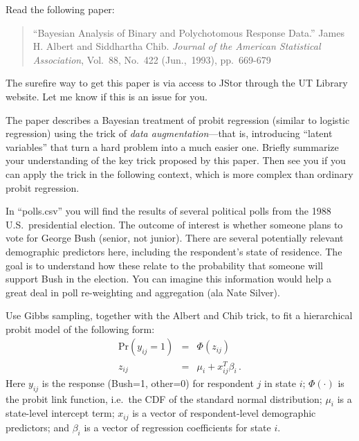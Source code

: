 \documentclass{article}
\begin{document}
Read the following paper:
\begin{quotation}
``Bayesian Analysis of Binary and Polychotomous Response Data.''  James H. Albert and Siddhartha Chib.  \textit{Journal of the American Statistical Association}, Vol.~88, No.~422 (Jun.,~1993), pp.~669-679
\end{quotation}
The surefire way to get this paper is via access to JStor through the UT Library website.  Let me know if this is an issue for you.

The paper describes a Bayesian treatment of probit regression (similar to logistic regression) using the trick of \textit{data augmentation}---that is, introducing ``latent variables'' that turn a hard problem into a much easier one.  Briefly summarize your understanding of the key trick proposed by this paper.  Then see you if you can apply the trick in the following context, which is more complex than ordinary probit regression.

In ``polls.csv'' you will find the results of several political polls from the 1988 U.S.~presidential election.  The outcome of interest is whether someone plans to vote for George Bush (senior, not junior).  There are several potentially relevant demographic predictors here, including the respondent's state of residence.  The goal is to understand how these relate to the probability that someone will support Bush in the election.  You can imagine this information would help a great deal in poll re-weighting and aggregation (ala Nate Silver).

Use Gibbs sampling, together with the Albert and Chib trick, to fit a hierarchical probit model of the following form:
\begin{eqnarray*}
\mbox{Pr}(y_{ij} = 1) &=& \Phi(z_{ij})  \\
z_{ij} &=& \mu_i + x_{ij}^T \beta_i \, .
\end{eqnarray*}
Here $y_{ij}$ is the response (Bush=1, other=0) for respondent $j$ in state $i$; $\Phi(\cdot)$ is the probit link function, i.e.~the CDF of the standard normal distribution; $\mu_i$ is a state-level intercept term; $x_{ij}$ is a vector of respondent-level demographic predictors; and $\beta_i$ is a vector of regression coefficients for state $i$.
\end{document}
